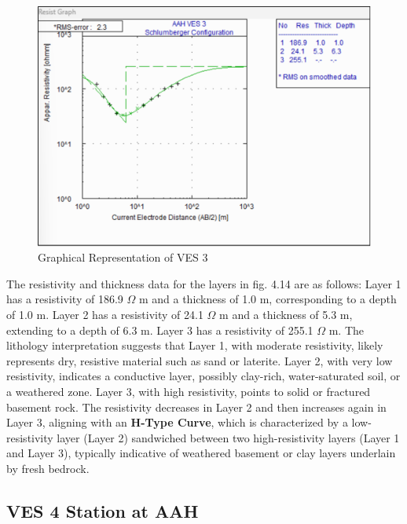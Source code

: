 \documentclass[12pt,a4paper]{report}
\begin{document}
\begin{figure}[H]
    \centering
    \includegraphics[width=1.0\textwidth]{aah_ves3.png}
    \caption{Graphical Representation of VES 3}
    \label{fig:AAH_VES_3_Curve}
\end{figure}
The resistivity and thickness data for the layers  in fig. 4.14 are as follows: Layer 1 has a resistivity of 186.9 $\Omega$ m and a thickness of 1.0 m, corresponding to a depth of 1.0 m. Layer 2 has a resistivity of 24.1 $\Omega$ m and a thickness of 5.3 m, extending to a depth of 6.3 m. Layer 3 has a resistivity of 255.1 $\Omega$ m. The lithology interpretation suggests that Layer 1, with moderate resistivity, likely represents dry, resistive material such as sand or laterite. Layer 2, with very low resistivity, indicates a conductive layer, possibly clay-rich, water-saturated soil, or a weathered zone. Layer 3, with high resistivity, points to solid or fractured basement rock. The resistivity decreases in Layer 2 and then increases again in Layer 3, aligning with an \textbf{H-Type Curve}, which is characterized by a low-resistivity layer (Layer 2) sandwiched between two high-resistivity layers (Layer 1 and Layer 3), typically indicative of weathered basement or clay layers underlain by fresh bedrock.

\subsection{VES 4 Station at AAH}
\end{document}

